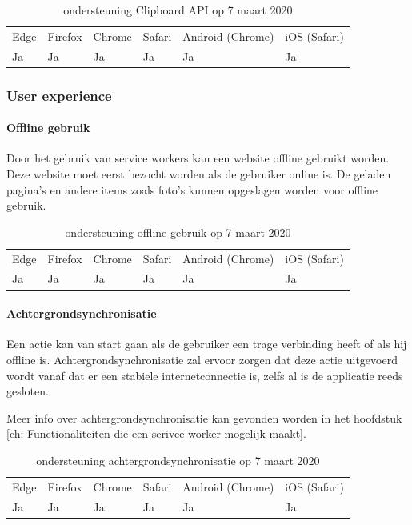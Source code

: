 	\begin{table}[H]
		\centering
		\begin{tabular}{llllll}
			Edge & Firefox & Chrome & Safari & Android (Chrome) & iOS (Safari) \\
			Ja   & Ja      &  Ja     & Ja     & Ja             & Ja          
		\end{tabular}	
		\caption{ondersteuning Clipboard API op 7 maart 2020}
	\end{table}	
	
	
	\subsubsection{User experience}
	
	\paragraph{Offline gebruik}
	Door het gebruik van service workers kan een website offline gebruikt worden. Deze website moet eerst bezocht worden als de gebruiker online is. De geladen pagina's en andere items zoals foto's kunnen opgeslagen worden voor offline gebruik.
	
	\begin{table}[H]
		\begin{tabular}{llllll}
			Edge & Firefox & Chrome & Safari & Android (Chrome) & iOS (Safari) \\
			Ja   & Ja      &  Ja     & Ja     & Ja               & Ja          
		\end{tabular}	
		\caption{ondersteuning offline gebruik op 7 maart 2020}
	\end{table}	
	
	
	
	\paragraph{Achtergrondsynchronisatie }
	
	Een actie kan van start gaan als de gebruiker een trage verbinding heeft of als hij offline is. Achtergrondsynchronisatie zal ervoor zorgen dat deze actie uitgevoerd wordt vanaf dat er een stabiele internetconnectie is, zelfs al is de applicatie reeds gesloten.
	
	Meer info over achtergrondsynchronisatie kan gevonden worden in het hoofdstuk \ref{ch: Functionaliteiten die een serivce worker mogelijk maakt}.
	
	
	\begin{table}[H]
		\centering
		\begin{tabular}{llllll}
			Edge & Firefox & Chrome & Safari & Android (Chrome) & iOS (Safari) \\
			Ja   & Ja      &  Ja     & Ja     & Ja               & Ja          
		\end{tabular}	
		\caption{ondersteuning achtergrondsynchronisatie op 7 maart 2020}
	\end{table}
	
